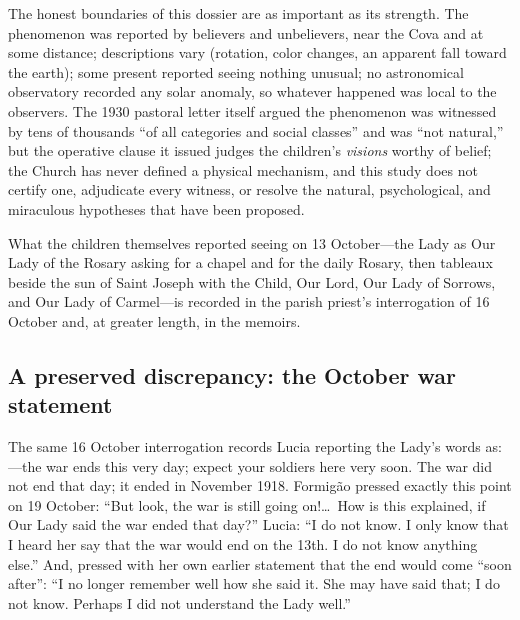 The honest boundaries of this dossier are as important as its
strength. The phenomenon was reported by believers and unbelievers,
near the Cova and at some distance; descriptions vary (rotation,
color changes, an apparent fall toward the earth); some present
reported seeing nothing unusual; no astronomical observatory recorded
any solar anomaly, so whatever happened was local to the observers.
The 1930 pastoral letter itself argued the phenomenon was witnessed
by tens of thousands ``of all categories and social classes'' and
was ``not natural,'' but the operative clause it issued judges the
children's \emph{visions} worthy of belief; the Church has never
defined a physical mechanism, and this study does not certify one,
adjudicate every witness, or resolve the natural, psychological, and
miraculous hypotheses that have been proposed.

What the children themselves reported seeing on 13 October---the Lady
as Our Lady of the Rosary asking for a chapel and for the daily
Rosary, then tableaux beside the sun of Saint Joseph with the Child,
Our Lord, Our Lady of Sorrows, and Our Lady of Carmel---is recorded
in the parish priest's interrogation of 16 October and, at greater
length, in the memoirs.

\subsection{A preserved discrepancy: the October war statement}

The same 16 October interrogation records Lucia reporting the Lady's
words as: ---the war ends this very day; expect your
soldiers here very soon. The war did not end that day; it ended in
November 1918. Formig\~ao pressed exactly this point on 19 October:
``But look, the war is still going on!\ldots\ How is this explained,
if Our Lady said the war ended that day?'' Lucia: ``I do not know. I
only know that I heard her say that the war would end on the 13th. I
do not know anything else.'' And, pressed with her own earlier
statement that the end would come ``soon after'': ``I no longer
remember well how she said it. She may have said that; I do not know.
Perhaps I did not understand the Lady well.''

